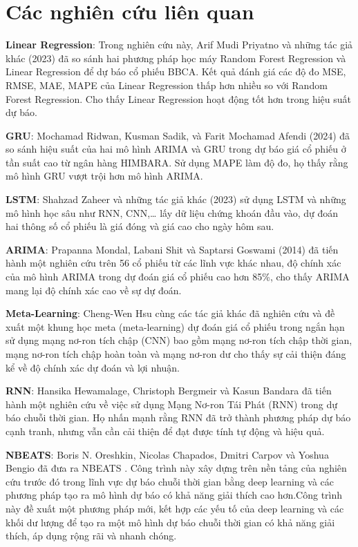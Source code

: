 \section{Các nghiên cứu liên quan}
\textbf{Linear Regression}: Trong nghiên cứu này, Arif Mudi Priyatno và những tác giả khác \cite{b1} (2023) đã so sánh hai phương pháp học máy Random Forest Regression và Linear Regression để dự báo cổ phiếu BBCA. Kết quả đánh giá các độ đo MSE, RMSE, MAE, MAPE của Linear Regression thấp hơn nhiều so với Random Forest Regression. Cho thấy Linear Regression hoạt động tốt hơn trong hiệu suất dự báo.
\par
\textbf{GRU}: Mochamad Ridwan, Kusman Sadik, và Farit Mochamad Afendi \cite{b2} (2024) đã so sánh hiệu suất của hai mô hình ARIMA và GRU trong dự báo giá cổ phiếu ở tần suất cao từ ngân hàng HIMBARA. Sử dụng MAPE làm độ đo, họ thấy rằng mô hình GRU vượt trội hơn mô hình ARIMA.
\par
\textbf{LSTM}: Shahzad Zaheer và những tác giả khác \cite{b3} (2023) sử dụng LSTM và những mô hình học sâu như RNN, CNN,… lấy dữ liệu chứng khoán đầu vào, dự đoán hai thông số cổ phiếu là giá đóng và giá cao cho ngày hôm sau.
\par
\textbf{ARIMA}: Prapanna Mondal, Labani Shit và Saptarsi Goswami \cite{b4} (2014) đã tiến hành một nghiên cứu trên 56 cổ phiếu từ các lĩnh vực khác nhau, độ chính xác của mô hình ARIMA trong dự đoán giá cổ phiếu cao hơn 85\%, cho thấy ARIMA mang lại độ chính xác cao về sự dự đoán.
\par
\textbf{Meta-Learning}: Cheng-Wen Hsu cùng các tác giả khác \cite{b5} đã nghiên cứu và đề xuất một khung học meta (meta-learning) dự đoán giá cổ phiếu trong ngắn hạn sử dụng mạng nơ-ron tích chập (CNN) bao gồm mạng nơ-ron tích chập thời gian, mạng nơ-ron tích chập hoàn toàn và mạng nơ-ron dư cho thấy sự cải thiện đáng kể về độ chính xác dự đoán và lợi nhuận.
\par
\textbf{RNN}: 
Hansika Hewamalage, Christoph Bergmeir và Kasun Bandara đã tiến hành một nghiên cứu về việc sử dụng Mạng Nơ-ron Tái Phát (RNN) \cite{b6} trong dự báo chuỗi thời gian. Họ nhấn mạnh rằng RNN đã trở thành phương pháp dự báo cạnh tranh, nhưng vẫn cần cải thiện để đạt được tính tự động và hiệu quả. 
\par
\textbf{NBEATS}: Boris N. Oreshkin, Nicolas Chapados, Dmitri Carpov và Yoshua Bengio đã đưa ra NBEATS \cite{b7}. Công trình này xây dựng trên nền tảng của nghiên cứu trước đó trong lĩnh vực dự báo chuỗi thời gian bằng deep learning và các phương pháp tạo ra mô hình dự báo có khả năng giải thích cao hơn.Công trình này đề xuất một phương pháp mới, kết hợp các yếu tố của deep learning và các khối dư lượng để tạo ra một mô hình dự báo chuỗi thời gian có khả năng giải thích, áp dụng rộng rãi và nhanh chóng.
